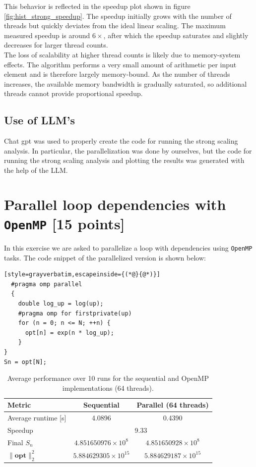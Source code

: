\documentclass[unicode,10pt,a4paper,oneside,numbers=endperiod,openany]{scrartcl}
\begin{document}
This behavior is reflected in the speedup plot shown in figure \ref{fig:hist_strong_speedup}. The speedup initially grows with the number of threads but quickly deviates from the ideal linear scaling. The maximum measured speedup is around $6\times$, after which the speedup saturates and slightly decreases for larger thread counts.\\

The loss of scalability at higher thread counts is likely due to memory-system effects. The algorithm performs a very small amount of arithmetic per input element and is therefore largely memory-bound. As the number of threads increases, the available memory bandwidth is gradually saturated, so additional threads cannot provide proportional speedup.
\subsection{Use of LLM's}
Chat gpt was used to properly create the code for running the strong scaling analysis. In particular, the parallelization was done by ourselves, but the code for running the strong scaling analysis and plotting the results was generated with the help of the LLM.
\newpage
\section{Parallel loop dependencies with \texttt{OpenMP} [15 points]}
In this exercise we are asked to parallelize a loop with dependencies using \texttt{OpenMP} tasks. The code snippet of the parallelized version is shown below:
\begin{lstlisting}[style=grayverbatim,escapeinside={(*@}{@*)}]
  #pragma omp parallel
  {
    double log_up = log(up);
    #pragma omp for firstprivate(up)
    for (n = 0; n <= N; ++n) {
      opt[n] = exp(n * log_up);
    }
}
Sn = opt[N];
\end{lstlisting}
\begin{table}[!h]
\centering
\caption{Average performance over 10 runs for the sequential and OpenMP implementations (64 threads).}
\begin{tabular}{lcc}
\hline
Metric & Sequential & Parallel (64 threads) \\
\hline
Average runtime [s] & 4.0896 & 0.4390 \\
Speedup & \multicolumn{2}{c}{9.33} \\
Final $S_n$ & $4.851650976\times10^{8}$ & $4.851650928\times10^{8}$ \\
$\|\mathbf{opt}\|_2^2$ & $5.884629305\times10^{15}$ & $5.884629187\times10^{15}$ \\
\hline
\end{tabular}
\label{tab:dependencies_results}
\end{table}
\end{document}
